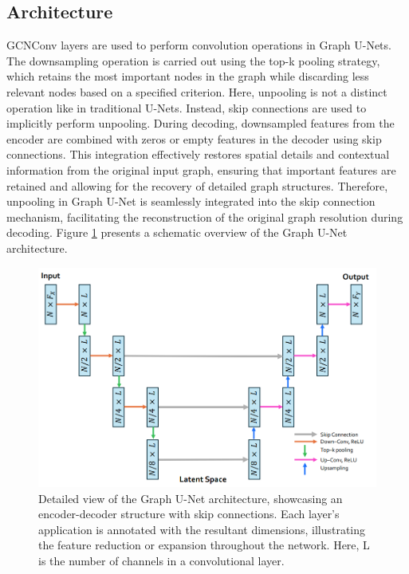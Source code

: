 \subsection{Architecture}
GCNConv layers are used to perform convolution operations in Graph U-Nets. The downsampling operation is carried out using the top-k pooling strategy, which retains the most important nodes in the graph while discarding less relevant nodes based on a specified criterion. Here, unpooling is not a distinct operation like in traditional U-Nets. Instead, skip connections are used to implicitly perform unpooling. During decoding, downsampled features from the encoder are combined with zeros or empty features in the decoder using skip connections. This integration effectively restores spatial details and contextual information from the original input graph, ensuring that important features are retained and allowing for the recovery of detailed graph structures. Therefore, unpooling in Graph U-Net is seamlessly integrated into the skip connection mechanism, facilitating the reconstruction of the original graph resolution during decoding. Figure \ref{fig:GraphUnet} presents a schematic overview of the Graph U-Net architecture. 
\begin{figure}[ht]
    \centering
    \includegraphics[width=12cm]{images/Methodology/GraphUNet.png}
    \caption{Detailed view of the Graph U-Net architecture, showcasing an encoder-decoder structure with skip connections. Each layer’s application is annotated with the resultant dimensions, illustrating the feature reduction or expansion throughout the network. Here, L is the number of channels in a convolutional layer.}
    \label{fig:GraphUnet}
\end{figure}
